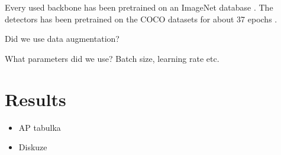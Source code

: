 Every used backbone has been pretrained on an ImageNet database \cite{imagenet}.
The detectors has been pretrained on the COCO datasets \cite{coco} for about
37 epochs \cite{detectron}.

Did we use data augmentation?

What parameters did we use? Batch size, learning rate etc.

\section{Results}
\begin{itemize}
	\item AP tabulka
	\item Diskuze
\end{itemize}

